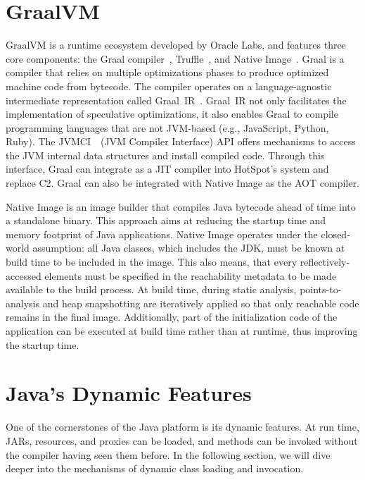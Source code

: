 \section{GraalVM}
GraalVM is a runtime ecosystem developed by Oracle Labs, and features three core components: the Graal compiler~\cite{noauthor_graal_nodate}, Truffle~\cite{noauthor_truffle_nodate}, and Native Image~\cite{wimmer_initialize_2019}.
Graal is a compiler that relies on multiple optimizations phases to produce optimized machine code from bytecode. The compiler operates on a language-agnostic intermediate representation called Graal~IR~\cite{duboscq_graal_2013}. Graal~IR not only facilitates the implementation of speculative optimizations, it also enables Graal to compile programming languages that are not JVM-based (e.g., JavaScript, Python, Ruby). %
The JVMCI~\cite{noauthor_jep_nodate}~(JVM Compiler Interface) API offers mechanisms to access the JVM internal data structures and install compiled code. Through this interface, Graal can integrate as a JIT compiler into HotSpot's system and replace C2. 
Graal can also be integrated with Native Image as the AOT compiler.

Native Image is an image builder that compiles Java bytecode ahead of time into a standalone binary. This approach aims at reducing the startup time and memory footprint of Java applications. Native Image operates under the closed-world assumption: all Java classes, which includes the JDK, must be known at build time to be included in the image.
This also means, that every reflectively-accessed elements must be specified in the reachability metadata to be made available to the build process. 
At build time, during static analysis, points-to-analysis and heap snapshotting are iteratively applied so that only reachable code remains in the final image. Additionally, part of the initialization code of the application can be executed at build time rather than at runtime, thus improving the startup time.

\section{Java's Dynamic Features}
One of the cornerstones of the Java platform is its dynamic features. At run time, JARs, resources, and proxies can be loaded, and methods can be invoked without the compiler having seen them before. In the following section, we will dive deeper into the mechanisms of dynamic class loading and invocation.

